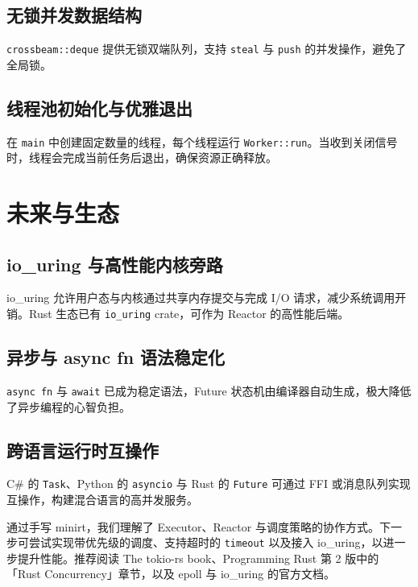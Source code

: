 \section{无锁并发数据结构}
\texttt{crossbeam::deque} 提供无锁双端队列，支持 \texttt{steal} 与 \texttt{push} 的并发操作，避免了全局锁。\par
\section{线程池初始化与优雅退出}
在 \texttt{main} 中创建固定数量的线程，每个线程运行 \texttt{Worker::run}。当收到关闭信号时，线程会完成当前任务后退出，确保资源正确释放。\par
\chapter{未来与生态}
\section{io\_{}uring 与高性能内核旁路}
io\_{}uring 允许用户态与内核通过共享内存提交与完成 I/O 请求，减少系统调用开销。Rust 生态已有 \texttt{io\_{}uring} crate，可作为 Reactor 的高性能后端。\par
\section{异步与 async fn 语法稳定化}
\texttt{async fn} 与 \texttt{await} 已成为稳定语法，Future 状态机由编译器自动生成，极大降低了异步编程的心智负担。\par
\section{跨语言运行时互操作}
C\#{} 的 \texttt{Task}、Python 的 \texttt{asyncio} 与 Rust 的 \texttt{Future} 可通过 FFI 或消息队列实现互操作，构建混合语言的高并发服务。\par
通过手写 minirt，我们理解了 Executor、Reactor 与调度策略的协作方式。下一步可尝试实现带优先级的调度、支持超时的 \texttt{timeout} 以及接入 io\_{}uring，以进一步提升性能。推荐阅读 The tokio-rs book、Programming Rust 第 2 版中的「Rust Concurrency」章节，以及 epoll 与 io\_{}uring 的官方文档。\par
